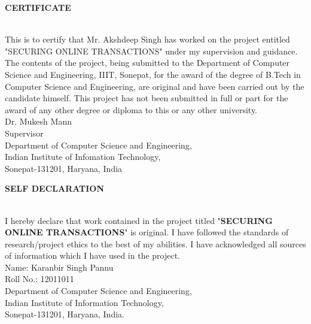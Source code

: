 \documentclass[12pt, oneside, a4paper]{article}
\begin{document}
\begin{center}
    \begin{Large}\textbf{CERTIFICATE}\end{Large}
\end{center}\\
\vspace{1cm}
This is to certify that Mr. Akshdeep Singh has worked on the project entitled "SECURING ONLINE TRANSACTIONS" under my supervision and guidance.
\vspace{0.5cm}\\
The contents of the project, being submitted to the Department of Computer Science and Engineering, IIIT, Sonepat, for the award of the degree of B.Tech in Computer Science and Engineering, are original and have been carried out by the candidate himself. This project has not been submitted in full or part for the award of any other degree or diploma to this or any other university.
\vspace{4cm}\\
Dr. Mukesh Mann\\
Supervisor
\vspace{5cm}\\
Department of Computer Science and Engineering,\\
Indian Institute of Infomation Technology,\\
Sonepat-131201, Haryana, India
\pagebreak

\begin{center}
    \begin{Large}\textbf{SELF DECLARATION}\end{Large}
\end{center}\\
\vspace{1cm}
I hereby declare that work contained in the project titled "\textbf{SECURING ONLINE TRANSACTIONS}" is original. I have followed the standards of research/project ethics to the best of my abilities. I have acknowledged all sources of information which I have used in the project.
\vspace{4cm}\\
Name: Karanbir Singh Pannu\\
Roll No.: 12011011\\
Department of Computer Science and Engineering,\\
Indian Institute of Information Technology,\\
Sonepat-131201, Haryana, India.
\pagebreak
\end{document}

